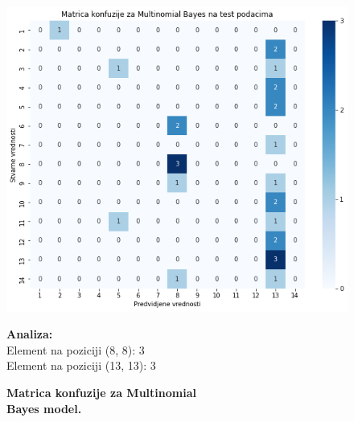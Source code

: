 \documentclass{article}
\begin{document}
\begin{figure}[ht]
    \begin{minipage}{0.5\textwidth}
        \centering
        \includegraphics[width=\linewidth]{MBconf.png}
        \captionsetup{justification=centering}
        \caption*{\textbf{Matrica konfuzije za Multinomial \\Bayes model.}}
        \label{fig:nedostajuce}
    \end{minipage}%
    \begin{minipage}{0.5\textwidth}
        \textbf{Analiza:}\\
        
        \vspace{1mm}
        Element na poziciji (8, 8): 3\\
        Element na poziciji (13, 13): 3\\
    \end{minipage}
\end{figure}
\end{document}
